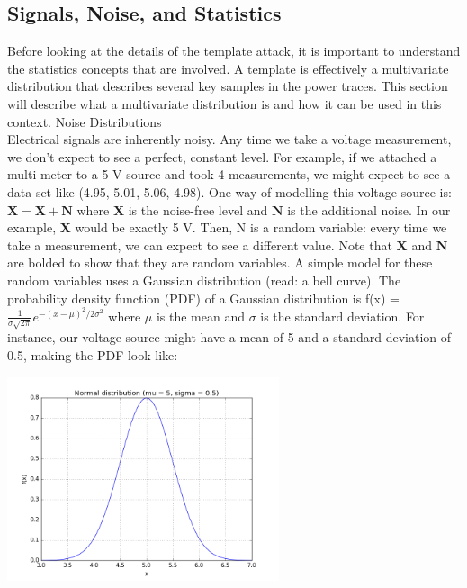     \subsection{Signals, Noise, and Statistics}
    Before looking at the details of the template attack, it is important to understand the statistics concepts that are involved. A template is effectively a multivariate distribution that describes several key samples in the power traces. This section will describe what a multivariate distribution is and how it can be used in this context.
    Noise Distributions\\
    Electrical signals are inherently noisy. Any time we take a voltage measurement, we don't expect to see a perfect, constant level. For example, if we attached a multi-meter to a 5 V source and took 4 measurements, we might expect to see a data set like (4.95, 5.01, 5.06, 4.98). One way of modelling this voltage source is: 
    $\mathbf{X} = \mathbf{X} + \mathbf{N}$
    where $\mathbf{X}$
    is the noise-free level and $\mathbf{N}$ is the additional noise. In our example, $\mathbf{X}$ would be exactly 5 V. Then, N is a random variable: every time we take a measurement, we can expect to see a different value. Note that $\mathbf{X}$ and $\mathbf{N}$ are bolded to show that they are random variables.
    A simple model for these random variables uses a Gaussian distribution (read: a bell curve). The probability density function (PDF) of a Gaussian distribution is
    f(x) = $ \frac{1}{\sigma \sqrt{2\pi}} e^{-(x - \mu)^2 / 2\sigma^2}$
    where $\displaystyle \mu$  is the mean and  $ \sigma$ is the standard deviation. For instance, our voltage source might have a mean of 5 and a standard deviation of 0.5, making the PDF look like:\\
    \begin{minipage}{\linewidth}
    \centering
    \includegraphics[width=8cm]{images/Lecture_5/Normal-Dist.png}
    \end{minipage}
